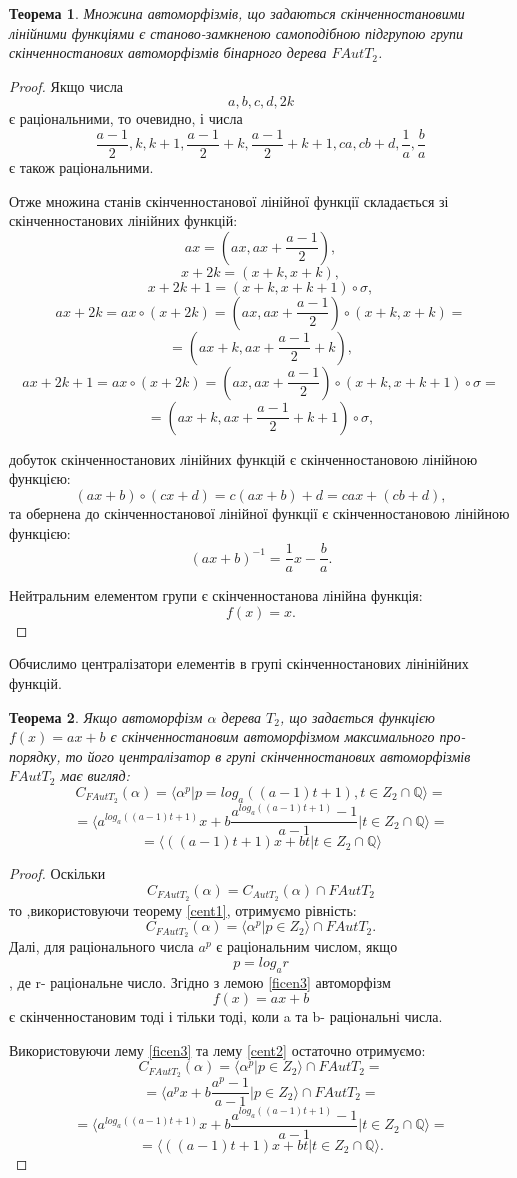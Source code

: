 \documentclass[a4paper,12pt]{article} \usepackage{a4wide}
\numberwithin{equation}{subsection}
\newtheorem{theorem}{Теорема}[subsection]
\begin{document}
\begin{theorem}
Множина автоморфізмів, що задаються скінченностановими лінійними функціями є станово-замкненою самоподібною підгрупою групи скінченностанових автоморфізмів бінарного дерева $FAutT_2$.
\end{theorem}
\begin{proof}
Якщо числа $$a,b,c,d,2k$$ є раціональними, то очевидно, і числа
$$\frac{a-1}{2},k,k+1,\frac{a-1}{2}+k,\frac{a-1}{2}+k+1,ca,cb+d,\frac{1}{a},\frac{b}{a}$$ є також раціональними.


 Отже множина станів скінченностанової лінійної функції складається зі  скінченностанових лінійних функцій:
$$ax=(ax,ax+\frac{a-1}{2}),$$
$$x+2k=(x+k,x+k),$$
$$x+2k+1=(x+k,x+k+1)\circ \sigma,$$
$$ax+2k=ax\circ (x+2k)=(ax,ax+\frac{a-1}{2})\circ (x+k,x+k)=$$ $$=(ax+k,ax+\frac{a-1}{2}+k),$$
$$ax+2k+1=ax\circ (x+2k)=(ax,ax+\frac{a-1}{2})\circ (x+k,x+k+1)\circ \sigma=$$ $$=(ax+k,ax+\frac{a-1}{2}+k+1)\circ \sigma,$$

добуток скінченностанових лінійних функцій є скінченностановою лінійною функцією:
$$(ax+b)\circ (cx+d)=c(ax+b)+d=cax+(cb+d),$$
та обернена до скінченностанової лінійної функції є скінченностановою лінійною функцією:
$$(ax+b)^{-1}=\frac{1}{a}x-\frac{b}{a}.$$

Нейтральним елементом групи є скінченностанова лінійна функція:
$$f(x)=x.$$
\end{proof}
Обчислимо централізатори  елементів в групі скінченностанових лінінійних функцій.
\begin{theorem}
Якщо автоморфізм $\alpha$ дерева $T_2$, що задається функцією $f(x)=ax+b$ є скінченностановим автоморфізмом максимального про-порядку, то його централізатор в групі скінченностанових автоморфізмів $FAutT_2$ має вигляд:
$$C_{FAutT_2}(\alpha)=\langle \alpha^p|p=log_a((a-1)t+1),t\in Z_2\cap \mathbb{Q}\rangle=$$ $$=\langle a^{log_a((a-1)t+1)}x+b\frac{a^{log_a((a-1)t+1)}-1}{a-1}|t\in Z_2\cap \mathbb{Q}\rangle=$$ $$=\langle ((a-1)t+1)x+bt|t\in Z_2\cap \mathbb{Q}\rangle$$

\end{theorem}
\begin{proof}
Оскільки $$C_{FAutT_2}(\alpha)=C_{AutT_2}(\alpha)\cap FAutT_2$$ то ,використовуючи теорему \ref{cent1}, отримуємо рівність:
$$C_{FAutT_2}(\alpha)=\langle \alpha ^p|p \in Z_2\rangle \cap FAutT_2.$$
Далі, для раціонального числа $a^p$ є раціональним числом, якщо $$p=log_ar$$, де r- раціональне число. Згідно з лемою \ref{ficen3} автоморфізм $$f(x)=ax+b$$ є скінченностановим тоді і тільки тоді, коли a та b- раціональні числа.

Використовуючи лему \ref{ficen3} та лему  \ref{cent2} остаточно отримуємо:
$$C_{FAutT_2}(\alpha)=\langle \alpha ^p|p \in Z_2\rangle \cap FAutT_2=$$ $$=\langle a^px+b\frac{a^p-1}{a-1}|p\in Z_2\rangle \cap FAutT_2=$$ $$=\langle a^{log_a((a-1)t+1)}x+b\frac{a^{log_a((a-1)t+1)}-1}{a-1}|t\in Z_2\cap \mathbb{Q}\rangle=$$ $$=\langle ((a-1)t+1)x+bt|t\in Z_2\cap \mathbb{Q}\rangle.$$
\end{proof}
\end{document}
